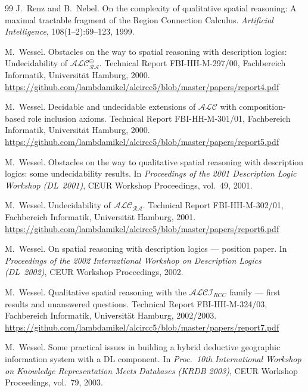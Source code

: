 \documentclass[
]{ceurart}
\theoremstyle{definition}
\newcommand{\ALC}{\ensuremath{\mathcal{ALC}}}
\newcommand{\ALCIRCC}[1]{\ensuremath{\mathcal{ALCI}_{\mathit{RCC#1}}}}
\begin{document}
\begin{thebibliography}{99}
J.\ Renz and B.\ Nebel.
\newblock On the complexity of qualitative spatial reasoning:
  A maximal tractable fragment of the Region Connection Calculus.
\newblock \emph{Artificial Intelligence}, 108(1--2):69--123, 1999.

M.\ Wessel.
\newblock Obstacles on the way to spatial reasoning with description
  logics: Undecidability of $\ALC_{\mathcal{RA}}^\ominus$.
\newblock Technical Report FBI-HH-M-297/00, Fachbereich Informatik,
  Universit\"at Hamburg, 2000.
\newblock \url{https://github.com/lambdamikel/alcircc5/blob/master/papers/report4.pdf}

M.\ Wessel.
\newblock Decidable and undecidable extensions of $\ALC$ with
  composition-based role inclusion axioms.
\newblock Technical Report FBI-HH-M-301/01, Fachbereich Informatik,
  Universit\"at Hamburg, 2000.
\newblock \url{https://github.com/lambdamikel/alcircc5/blob/master/papers/report5.pdf}

M.\ Wessel.
\newblock Obstacles on the way to qualitative spatial reasoning with
  description logics: some undecidability results.
\newblock In \emph{Proceedings of the 2001 Description Logic Workshop
  (DL~2001)}, CEUR Workshop Proceedings, vol.~49, 2001.

M.\ Wessel.
\newblock Undecidability of $\ALC_{\mathcal{RA}}$.
\newblock Technical Report FBI-HH-M-302/01, Fachbereich Informatik,
  Universit\"at Hamburg, 2001.
\newblock \url{https://github.com/lambdamikel/alcircc5/blob/master/papers/report6.pdf}

M.\ Wessel.
\newblock On spatial reasoning with description logics --- position paper.
\newblock In \emph{Proceedings of the 2002 International Workshop on
  Description Logics (DL~2002)}, CEUR Workshop Proceedings, 2002.

M.\ Wessel.
\newblock Qualitative spatial reasoning with the $\ALCIRCC{}$ family ---
  first results and unanswered questions.
\newblock Technical Report FBI-HH-M-324/03, Fachbereich Informatik,
  Universit\"at Hamburg, 2002/2003.
\newblock \url{https://github.com/lambdamikel/alcircc5/blob/master/papers/report7.pdf}

 M.\ Wessel.  \newblock Some practical issues
  in building a hybrid deductive geographic information system with a
  {DL} component.  \newblock In \emph{Proc.\ 10th International
  Workshop on Knowledge Representation Meets Databases (KRDB 2003)},
  CEUR Workshop Proceedings, vol.~79, 2003.


\end{thebibliography}
\end{document}

